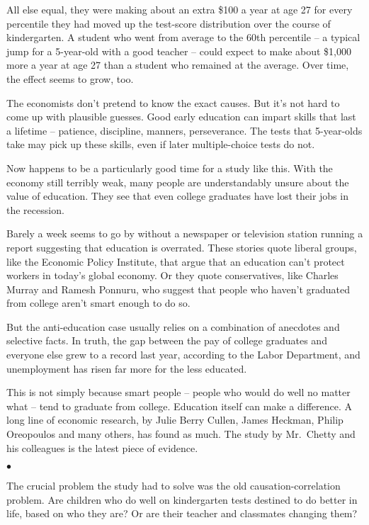 ﻿\documentclass[12pt]{article}
\begin{document}
All else equal, they were making about an extra \$100 a year at age 27 for every percentile they had
moved up the test-score distribution over the course of kindergarten. A student who went from
average to the 60th percentile -- a typical jump for a 5-year-old with a good teacher -- could
expect to make about \$1,000 more a year at age 27 than a student who remained at the average. Over
time, the effect seems to grow, too.

The economists don't pretend to know the exact causes. But it's not hard to come up with plausible
guesses. Good early education can impart skills that last a lifetime -- patience, discipline,
manners, perseverance. The tests that 5-year-olds take may pick up these skills, even if later
multiple-choice tests do not.

Now happens to be a particularly good time for a study like this. With the economy still terribly
weak, many people are understandably unsure about the value of education. They see that even college
graduates have lost their jobs in the recession.

Barely a week seems to go by without a newspaper or television station running a report suggesting
that education is overrated. These stories quote liberal groups, like the Economic Policy Institute,
that argue that an education can't protect workers in today's global economy. Or they quote
conservatives, like Charles Murray and Ramesh Ponnuru, who suggest that people who haven't graduated
from college aren't smart enough to do so.

But the anti-education case usually relies on a combination of anecdotes and selective facts. In
truth, the gap between the pay of college graduates and everyone else grew to a record last year,
according to the Labor Department, and unemployment has risen far more for the less educated.

This is not simply because smart people -- people who would do well no matter what -- tend to
graduate from college. Education itself can make a difference. A long line of economic research, by
Julie Berry Cullen, James Heckman, Philip Oreopoulos and many others, has found as much. The study
by Mr.~Chetty and his colleagues is the latest piece of evidence.

$\bullet$

The crucial problem the study had to solve was the old causation-correlation problem. Are children
who do well on kindergarten tests destined to do better in life, based on who they are? Or are their
teacher and classmates changing them?
\end{document}
